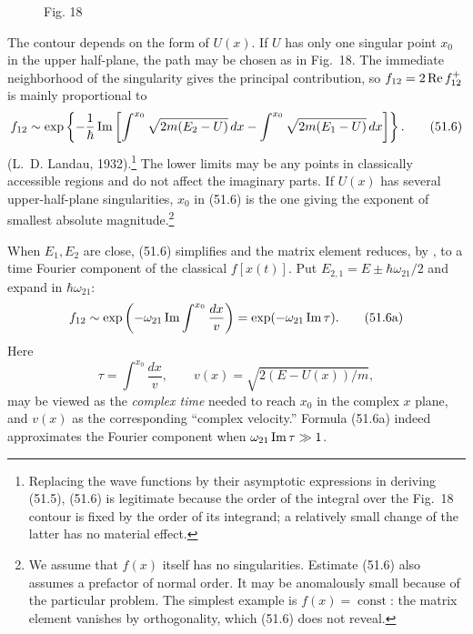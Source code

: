 \begin{figure}[ht]
\centering
{}
\par\smallskip Fig. 18
\end{figure}

The contour depends on the form of $U(x)$. If $U$ has only one singular point
$x_0$ in the upper half-plane, the path may be chosen as in Fig.~18. The
immediate neighborhood of the singularity gives the principal contribution,
so $f_{12}=2\mathop{\rm Re}f_{12}^+$ is mainly proportional to
\begin{equation}
 f_{12}\sim\exp\left\{-\frac1\hbar\mathop{\rm Im}\left[
 \int^{x_0}\sqrt{2m(E_2-U)}\,dx-
 \int^{x_0}\sqrt{2m(E_1-U)}\,dx\right]\right\}. \tag{51.6}
\end{equation}
(L.~D. Landau, 1932).\footnote{Replacing the wave functions by their
asymptotic expressions in deriving (51.5), (51.6) is legitimate because the
order of the integral over the Fig.~18 contour is fixed by the order of its
integrand; a relatively small change of the latter has no material effect.}
The lower limits may be any points in classically accessible regions and do
not affect the imaginary
parts. If $U(x)$ has several upper-half-plane singularities, $x_0$ in (51.6)
is the one giving the exponent of smallest absolute magnitude.\footnote{We
assume that $f(x)$ itself has no singularities. Estimate (51.6) also assumes
a prefactor of normal order. It may be anomalously small because of the
particular problem. The simplest example is $f(x)=\operatorname{const}$: the
matrix element vanishes by orthogonality, which (51.6) does not reveal.}

When $E_1,E_2$ are close, (51.6) simplifies and the matrix element reduces,
by , to a time Fourier component of the classical $f[x(t)]$. Put
$E_{2,1}=E\pm\hbar\omega_{21}/2$ and expand in $\hbar\omega_{21}$:
\begin{equation}
 f_{12}\sim\exp\left(-\omega_{21}\mathop{\rm Im}
 \int^{x_0}\frac{dx}{v}\right)=\exp(-\omega_{21}\mathop{\rm Im}\tau). \tag{51.6a}
\end{equation}
Here
\[
 \tau=\int^{x_0}\frac{dx}{v},\qquad v(x)=\sqrt{2(E-U(x))/m},
\]
may be viewed as the \emph{complex time} needed to reach $x_0$ in the complex
$x$ plane, and $v(x)$ as the corresponding ``complex velocity.'' Formula
(51.6a) indeed approximates the Fourier component when
$\omega_{21}\mathop{\rm Im}\tau\gg1$.

